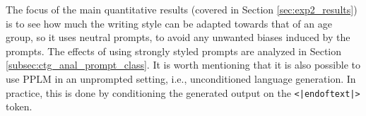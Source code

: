 The focus of the main quantitative results (covered in Section \ref{sec:exp2_results}) is to see how much the writing style can be adapted towards that of an age group, so it uses neutral prompts, to avoid any unwanted biases induced by the prompts. The effects of using strongly styled prompts are analyzed in Section \ref{subsec:ctg_anal_prompt_class}. It is worth mentioning that it is also possible to use PPLM in an unprompted setting, i.e., unconditioned language generation. In practice, this is done by conditioning the generated output on the \texttt{<|endoftext|>} token. 


